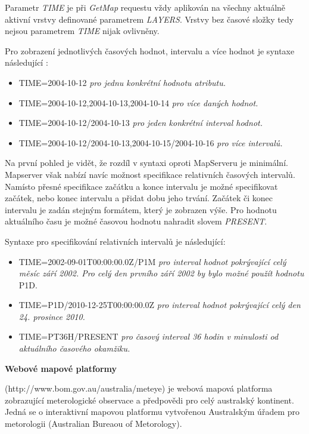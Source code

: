 Parametr \textit{TIME} je při \textit{GetMap} requestu vždy aplikován
na všechny aktuálně aktivní vrstvy definované parametrem
\textit{LAYERS}. Vrstvy bez časové složky tedy nejsou parametrem
\textit{TIME} nijak ovlivněny.

Pro zobrazení jednotlivých časových hodnot, intervalu a více hodnot je
syntaxe následující \cite{geoserver-time}:

\begin{itemize}
	\item TIME=2004-10-12 \textit{pro jednu konkrétní hodnotu
atributu.}
	\item TIME=2004-10-12,2004-10-13,2004-10-14 \textit{pro více
daných hodnot.}
	\item TIME=2004-10-12/2004-10-13 \textit{pro jeden konkrétní
interval hodnot.}
	\item TIME=2004-10-12/2004-10-13,2004-10-15/2004-10-16
\textit{pro více intervalů.}
\end{itemize}

Na první pohled je vidět, že rozdíl v syntaxi oproti MapServeru je
minimální. Mapserver však nabízí navíc možnost specifikace relativních
časových intervalů. Namísto přesné specifikace začátku a konce
intervalu je možné specifikovat začátek, nebo konec intervalu a přidat
dobu jeho trvání. Začátek či konec intervalu je zadán stejným
formátem, který je zobrazen výše. Pro hodnotu aktuálního času je možné
časovou hodnotu nahradit slovem \textit{PRESENT}.

Syntaxe pro specifikování relativních intervalů je
následující\cite{geoserver-time}:

\begin{itemize}
	\item TIME=2002-09-01T00:00:00.0Z/P1M \textit{pro interval
hodnot pokrývající celý měsíc září 2002. Pro celý den prvního září
2002 by bylo možné použít hodnotu} P1D.
	\item TIME=P1D/2010-12-25T00:00:00.0Z \textit{pro interval
hodnot pokrývající celý den 24. prosince 2010.}
	\item TIME=PT36H/PRESENT \textit{pro časový interval 36 hodin
v minulosti od aktuálního časového okamžiku.}
\end{itemize}

\bigskip
\noindent \textbf{Webové mapové platformy}

(http://www.bom.gov.au/australia/meteye) je webová mapová platforma
zobrazující meterologické observace a předpovědi pro celý australský
kontinent. Jedná se o interaktivní mapovou platformu vytvořenou
Australským úřadem pro metorologii (Australian Bureaou of Metorology).

